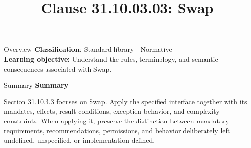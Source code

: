 \documentclass[10pt,letterpaper]{article}
\title{Clause 31.10.03.03: Swap}
\author{}
\date{}
\begin{document}
\maketitle
\begin{CornellOverviewBox}{Overview}
\textbf{Classification:} Standard library - Normative\\[2pt]
\textbf{Learning objective:} Understand the rules, terminology, and semantic consequences associated with Swap.
\end{CornellOverviewBox}\begin{CornellSummaryBox}{Summary}
{\sffamily\bfseries\color{Accent} Summary}\par\vspace{3pt}Section 31.10.3.3 focuses on Swap. Apply the specified interface together with its mandates, effects, result conditions, exception behavior, and complexity constraints. When applying it, preserve the distinction between mandatory requirements, recommendations, permissions, and behavior deliberately left undefined, unspecified, or implementation-defined.
\end{CornellSummaryBox}
\end{document}
